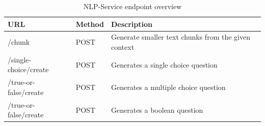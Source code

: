 \begin{table}[H]
    \begin{tabular}{|l|l|l|}
        \hline
        \textbf{URL} & \textbf{Method} & \textbf{Description} \\
        \hline
        /chunk & POST & Generate smaller text chunks from the given context\\
        \hline
        /single-choice/create & POST & Generates a single choice question \\
        \hline
        /true-or-false/create & POST & Generates a multiple choice question \\
        \hline
        /true-or-false/create & POST & Generates a boolean question \\
        \hline
    \end{tabular}
    \caption{NLP-Service endpoint overview}
    \label{tab:nlp-service-endpoints}
\end{table}